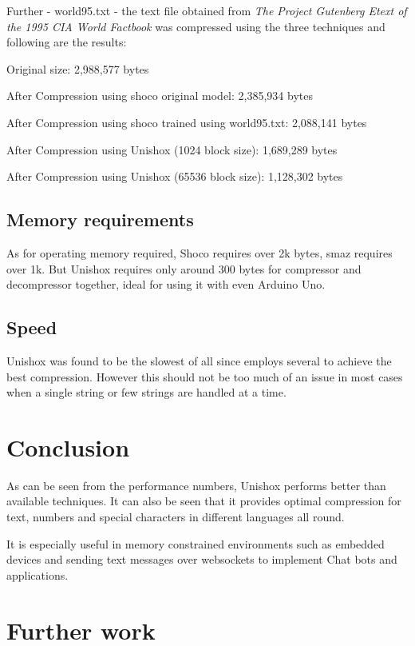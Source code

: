 \documentclass[]{article}
\begin{document}
	Further - world95.txt - the text file obtained from \emph{The Project Gutenberg Etext of the 1995 CIA World Factbook} was compressed using the three techniques and following are the results:
	
	Original size: 2,988,577 bytes
	
	After Compression using shoco original model: 2,385,934 bytes
	
	After Compression using shoco trained using world95.txt: 2,088,141 bytes
	
	After Compression using Unishox (1024 block size): 1,689,289 bytes
	
	After Compression using Unishox (65536 block size): 1,128,302 bytes
	
	\subsection{Memory requirements}
	
	As for operating memory required, Shoco requires over 2k bytes, smaz requires over 1k. But Unishox requires only around $300$ bytes for compressor and decompressor together, ideal for using it with even Arduino Uno.
	
	\subsection{Speed}
	
	Unishox was found to be the slowest of all since employs several to achieve the best compression. However this should not be too much of an issue in most cases when a single string or few strings are handled at a time.
	
	\section{Conclusion}
	
	As can be seen from the performance numbers, Unishox performs better than available techniques. It can also be seen that it provides optimal compression for text, numbers and special characters in different languages all round.
	
	It is especially useful in memory constrained environments such as embedded devices and sending text messages over websockets to implement Chat bots and applications.
	
	\section{Further work}
	
\end{document}
